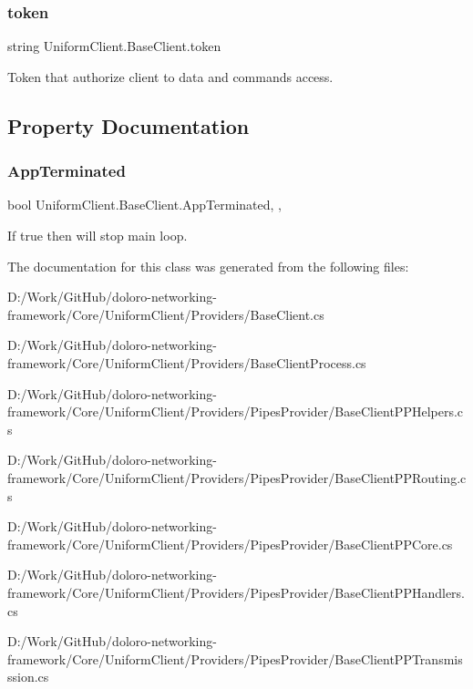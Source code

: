 \subsubsection{\texorpdfstring{token}{token}}
{\footnotesize\ttfamily string Uniform\+Client.\+Base\+Client.\+token\hspace{0.3cm}{\ttfamily [static]}}



Token that authorize client to data and commands access. 



\subsection{Property Documentation}
\mbox{\label{class_uniform_client_1_1_base_client_a10f1c9dbb8d41719754b39344432497f}} 
\subsubsection{\texorpdfstring{App\+Terminated}{AppTerminated}}
{\footnotesize\ttfamily bool Uniform\+Client.\+Base\+Client.\+App\+Terminated\hspace{0.3cm}{\ttfamily [static]}, {\ttfamily [get]}, {\ttfamily [set]}}



If true then will stop main loop. 



The documentation for this class was generated from the following files\+:\begin{DoxyCompactItemize}
\item 
D\+:/\+Work/\+Git\+Hub/doloro-\/networking-\/framework/\+Core/\+Uniform\+Client/\+Providers/Base\+Client.\+cs\item 
D\+:/\+Work/\+Git\+Hub/doloro-\/networking-\/framework/\+Core/\+Uniform\+Client/\+Providers/Base\+Client\+Process.\+cs\item 
D\+:/\+Work/\+Git\+Hub/doloro-\/networking-\/framework/\+Core/\+Uniform\+Client/\+Providers/\+Pipes\+Provider/Base\+Client\+P\+P\+Helpers.\+cs\item 
D\+:/\+Work/\+Git\+Hub/doloro-\/networking-\/framework/\+Core/\+Uniform\+Client/\+Providers/\+Pipes\+Provider/Base\+Client\+P\+P\+Routing.\+cs\item 
D\+:/\+Work/\+Git\+Hub/doloro-\/networking-\/framework/\+Core/\+Uniform\+Client/\+Providers/\+Pipes\+Provider/Base\+Client\+P\+P\+Core.\+cs\item 
D\+:/\+Work/\+Git\+Hub/doloro-\/networking-\/framework/\+Core/\+Uniform\+Client/\+Providers/\+Pipes\+Provider/Base\+Client\+P\+P\+Handlers.\+cs\item 
D\+:/\+Work/\+Git\+Hub/doloro-\/networking-\/framework/\+Core/\+Uniform\+Client/\+Providers/\+Pipes\+Provider/Base\+Client\+P\+P\+Transmisssion.\+cs\end{DoxyCompactItemize}
